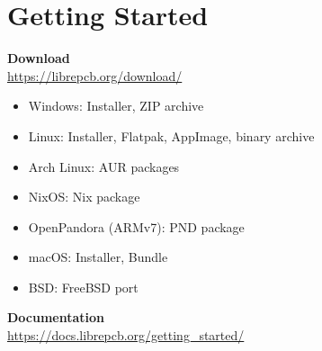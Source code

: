\section{Getting Started}

\begin{frame}{\secname}
  \begin{center}
    \bigskip \bigskip
    \large\textbf{Download}\\
    \url{https://librepcb.org/download/}

    \begin{itemize}
      \centering\small
      \item Windows: Installer, ZIP archive
      \item Linux: Installer, Flatpak, AppImage, binary archive
      \item Arch Linux: AUR packages
      \item NixOS: Nix package
      \item OpenPandora (ARMv7): PND package
      \item macOS: Installer, Bundle
      \item BSD: FreeBSD port
    \end{itemize}

    \bigskip \bigskip
    \large\textbf{Documentation}\\
    \url{https://docs.librepcb.org/getting_started/}
  \end{center}
\end{frame}
